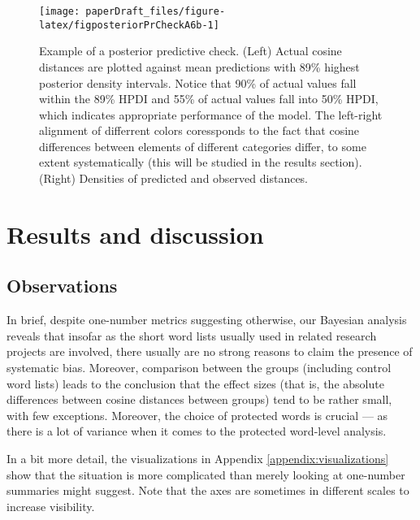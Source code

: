 \documentclass[
  12pt,
  dvipsnames,enabledeprecatedfontcommands]{scrartcl}
\begin{document}
\begin{figure}[H]

\begin{center}\texttt{[image: paperDraft\_files/figure-latex/figposteriorPrCheckA6b-1]} \end{center}
\caption{Example of a posterior predictive check. (Left) Actual cosine distances are plotted against mean predictions with 89\% highest posterior density intervals. Notice that 90\% of actual values fall within the 89\% HPDI and 55\% of actual values fall into 50\% HPDI, which indicates appropriate performance of the model. The left-right alignment of differrent colors coressponds to the fact that cosine differences between elements of different categories differ, to some extent systematically (this will be studied in the results section). (Right) Densities of predicted and observed distances.}
\label{fig:posteriorCheck1}
\end{figure}

\normalsize

\hypertarget{results-and-discussion}{%
\section{Results and discussion}\label{results-and-discussion}}

\vspace{1mm}
\footnotesize

\hypertarget{observations}{%
\subsection{Observations}\label{observations}}

In brief, despite one-number metrics suggesting otherwise, our Bayesian
analysis reveals that insofar as the short word lists usually used in
related research projects are involved, there usually are no strong
reasons to claim the presence of systematic bias. Moreover, comparison
between the groups (including control word lists) leads to the
conclusion that the effect sizes (that is, the absolute differences
between cosine distances between groups) tend to be rather small, with
few exceptions. Moreover, the choice of protected words is crucial ---
as there is a lot of variance when it comes to the protected word-level
analysis.

In a bit more detail, the visualizations in Appendix
\ref{appendix:visualizations} show that the situation is more
complicated than merely looking at one-number summaries might suggest.
Note that the axes are sometimes in different scales to increase
visibility.
\end{document}
